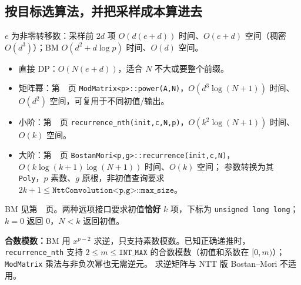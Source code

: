 \subsection{按目标选算法，并把采样成本算进去}
$e$ 为非零转移数：采样前 $2d$ 项 $O(d(e+d))$ 时间、$O(e+d)$ 空间（稠密 $O(d^3)$）；BM $O(d^2+d\log p)$ 时间、$O(d)$ 空间。
\begin{itemize}
\item 直接 DP：$O(N(e+d))$，适合 $N$ 不大或要整个前缀。
\item 矩阵幂：第~\pageref{compact-ModMatrix}~页 \texttt{ModMatrix<p>::power(A,N)}，$O(d^3\log(N+1))$ 时间、$O(d^2)$ 空间，可复用于不同初值/输出。
\item 小阶：第~\pageref{compact-recurrence_nth}~页 \texttt{recurrence\_nth(\allowbreak{}init,c,N,p)}，$O(k^2\log(N+1))$ 时间、$O(k)$ 空间。
\item 大阶：第~\pageref{compact-BostanMori}~页 \texttt{BostanMori<p,g>::recurrence(init,c,N)}，$O(k\log(k+1)\log(N+1))$ 时间、$O(k)$ 空间；
参数转换为其 \texttt{Poly}，$p$ 素数、$g$ 原根，非初值查询要求 $2k+1\le\texttt{NttConvolution<p,g>::max\_size}$。
\end{itemize}
BM 见第~\pageref{compact-berlekamp_massey}~页。两种远项接口要求初值\textbf{恰好} $k$ 项，下标为 \texttt{unsigned long long}；$k=0$ 返回 0，$N<k$ 返回初值。

\textbf{合数模数：}BM 用 $x^{p-2}$ 求逆，只支持素数模数。已知正确递推时，\texttt{recurrence\_nth} 支持
$2\le m\le\texttt{INT\_MAX}$ 的合数模数（初值和系数在 $[0,m)$）；\texttt{ModMatrix} 乘法与非负次幂也无需逆元。
求逆矩阵与 NTT 版 Bostan--Mori 不适用。
